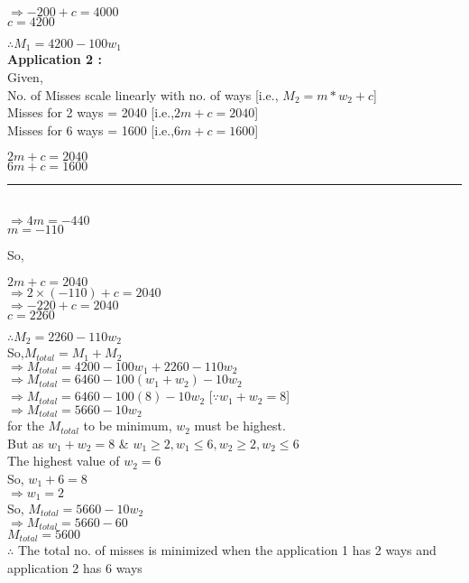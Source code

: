 \documentclass[letterpaper]{article}
\begin{document}
\begin{large}
\begin{flushleft}
\begin{enumerate}
{\begin{center}
$\Rightarrow -200+c=4000$\\[0.1in]
$\boxed{c=4200}$\\[0.1in]
\end{center}
$\therefore M_1 = 4200-100w_1$\\[0.2in]
\textbf{Application 2 :}\\[0.1in]
Given, \\[0.1in]No. of Misses scale linearly with no. of ways [i.e., $M_2 = m*w_2 + c$]\\[0.1in]Misses for 2 ways = 2040 [i.e.,$2m+c=2040$] \\[0.1in]Misses for 6 ways = 1600 [i.e.,$6m+c=1600$]\\[0.1in]
\begin{center}
$2m+c=2040$\\[0.01in]
$6m+c=1600$\\
\noindent\rule{4cm}{0.4pt}\\[0.01in]
$\Rightarrow 4m=-440$\\[0.05in]
$\boxed{m=-110}$\\[0.1in]
\end{center}
So, \begin{center}
$2m+c=2040$\\[0.1in]
$\Rightarrow 2\times(-110) + c = 2040$\\[0.1in]
$\Rightarrow -220+c=2040$\\[0.1in]
$\boxed{c=2260}$\\[0.1in]
\end{center}
$\therefore M_2 = 2260-110w_2$\\[0.2in]
So,$M_{total}=M_1+M_2$\\[0.1in]
$\Rightarrow M_{total}=4200-100w_1+2260-110w_2$\\[0.1in]
$\Rightarrow M_{total}=6460-100(w_1+w_2)-10w_2$\\[0.1in]
$\Rightarrow M_{total}=6460-100(8)-10w_2$ [$\because w_1+w_2=8$]\\[0.1in] 
$\Rightarrow M_{total}=5660-10w_2$\\[0.1in]
for the $M_{total}$ to be minimum, $w_2$ must be highest.\\[0.1in] But as $w_1+w_2=8$ \& $w_1\geq2,w_1\leq6,w_2\geq2,w_2\leq6$ \\[0.1in]The highest value of $\boxed{w_2 = 6}$\\[0.1in]
So, $w_1+6=8$\\[0.1in]
$\Rightarrow \boxed{w_1=2}$\\[0.1in]
So, $M_{total}=5660-10w_2$\\[0.1in]
$\Rightarrow M_{total}=5660-60$\\[0.1in]
$\boxed{M_{total}=5600}$\\[0.1in]
$\therefore$ The total no. of misses is minimized when the application 1 has 2 ways and application 2 has 6 ways\\[0.1in]}
\clearpage


\end{enumerate}
\end{flushleft}
\end{large}
\end{document}
